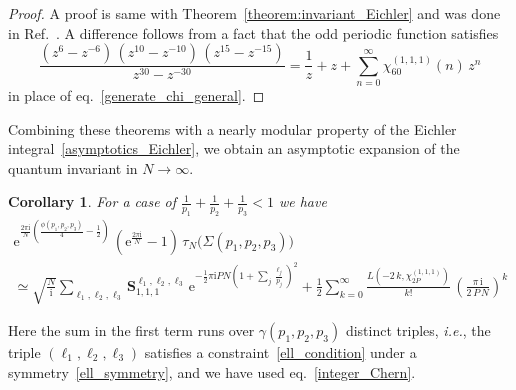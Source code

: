 \documentclass[12pt,reqno]{amsart}
\numberwithin{equation}{section}
\newtheorem{coro}[theorem]{Corollary}
\begin{document}
\begin{proof}
  A proof is same with Theorem~\ref{theorem:invariant_Eichler}
  and was done in Ref.~.
  A difference follows from a fact that
  the odd periodic function satisfies
  \begin{equation}
    \frac{
      (z^{6} - z^{- 6}) \,
      (z^{10} - z^{- 10}) \,
      (z^{15} - z^{- 15})
    }{
      z^{30} - z^{- 30}
    }
    =
    \frac{1}{z} + z +
    \sum_{n=0}^\infty
    \chi_{60}^{(1,1,1)}(n) \, z^{n}
  \end{equation}
  in place of eq.~\eqref{generate_chi_general}.
\end{proof}

Combining these theorems with a nearly modular property of the Eichler
integral~\eqref{asymptotics_Eichler}, we obtain an asymptotic expansion of the quantum invariant
in $N\to\infty$.

\begin{coro}
  For a case of $\frac{1}{p_1}+\frac{1}{p_2}+\frac{1}{p_3}<1$ 
  we have
  \begin{multline}
    \label{tau_limit}
    \mathrm{e}^{
      \frac{2 \pi \mathrm{i}}{N}
      ( \frac{\phi(p_1,p_2,p_3)}{4} - \frac{1}{2} )
    } \,
    \left(
      \mathrm{e}^{\frac{2 \pi \mathrm{i}}{N}} - 1
    \right)
    \,    \tau_N \bigl( \Sigma(p_1, p_2, p_3) \bigr)
    \\
    \simeq
    \sqrt{\frac{N}{ \mathrm{i}} }
    \sum_{\ell_1, \ell_2, \ell_3}
    \mathbf{S}_{1,1,1}^{\ell_1, \ell_2, \ell_3} \,
    \mathrm{e}^{- \frac{1}{2} \pi \mathrm{i} P N
      \left(
        1+\sum_j \frac{\ell_j}{p_j}
      \right)^2
    }
    + \frac{1}{2} \sum_{k=0}^\infty
    \frac{L(-2 \, k , \chi_{2 P}^{(1,1,1)})}{k!}
    \,
    \left(
      \frac{\pi \, \mathrm{i}}{
        2 \, P \, N
      }
    \right)^k
  \end{multline}
\end{coro}
Here the sum in the first term runs over $\gamma(p_1, p_2, p_3)$
distinct triples, \emph{i.e.}, the triple $(\ell_1, \ell_2, \ell_3)$
satisfies a constraint~\eqref{ell_condition} under a
symmetry~\eqref{ell_symmetry}, and we have used
eq.~\eqref{integer_Chern}.
\end{document}
